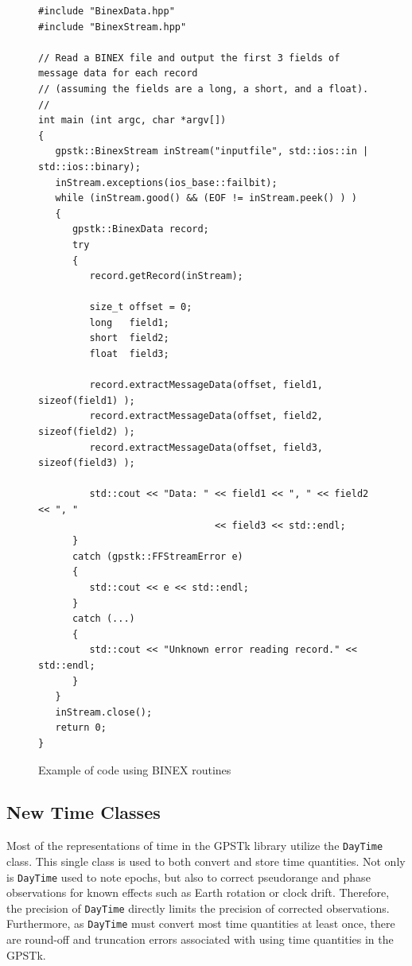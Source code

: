\documentclass{ion-gps}
\newcommand{\gpstkclass}[1]{\texttt{#1}}
\begin{document}
\begin{figure}[htbp]
\begin{small}
\begin{bf}
\begin{lstlisting}
#include "BinexData.hpp"
#include "BinexStream.hpp"

// Read a BINEX file and output the first 3 fields of message data for each record
// (assuming the fields are a long, a short, and a float).
//
int main (int argc, char *argv[])
{
   gpstk::BinexStream inStream("inputfile", std::ios::in | std::ios::binary);   
   inStream.exceptions(ios_base::failbit);
   while (inStream.good() && (EOF != inStream.peek() ) )
   {
      gpstk::BinexData record;
      try
      {
         record.getRecord(inStream);

         size_t offset = 0;
         long   field1;
         short  field2;
         float  field3;

         record.extractMessageData(offset, field1, sizeof(field1) );
         record.extractMessageData(offset, field2, sizeof(field2) );
         record.extractMessageData(offset, field3, sizeof(field3) );

         std::cout << "Data: " << field1 << ", " << field2 << ", "
                               << field3 << std::endl;
      }
      catch (gpstk::FFStreamError e)
      {
         std::cout << e << std::endl;
      }
      catch (...)
      {
         std::cout << "Unknown error reading record." << std::endl;
      }
   }
   inStream.close();
   return 0;
}

\end{lstlisting}
\end{bf}
\end{small}
\caption{Example of code using BINEX routines}
\label{fig:binexclientcode}
\end{figure}

\subsection*{New Time Classes}
Most of the representations of time in the GPSTk library utilize the
\gpstkclass{DayTime} class. This single class is used to both convert
and store time quantities. Not only is \gpstkclass{DayTime} used to
note epochs, but also to correct pseudorange and phase observations for
known effects such as Earth rotation or clock drift. Therefore,
the precision of \gpstkclass{DayTime} directly limits the precision of corrected
observations. Furthermore, as \gpstkclass{DayTime} must convert most
time quantities at least once, there are round-off and truncation
errors associated with using time quantities in the GPSTk.
\end{document}

